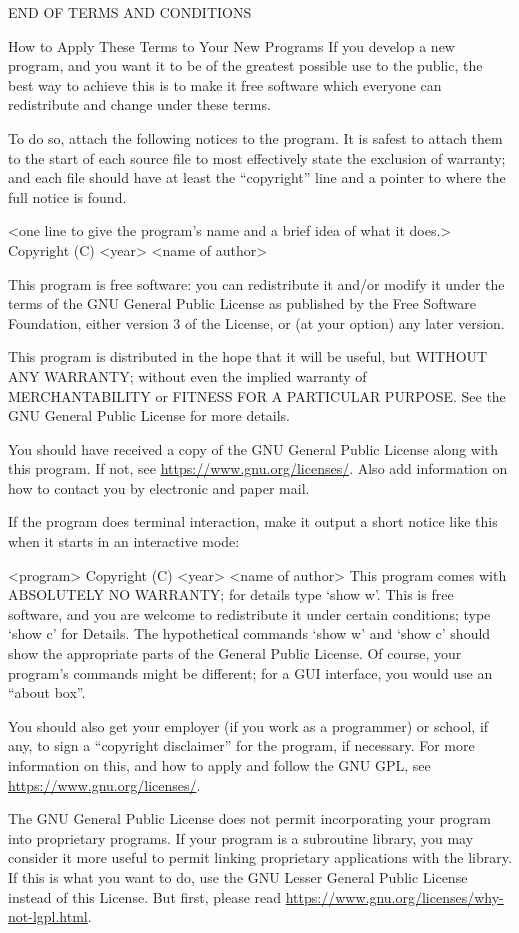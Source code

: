 \documentclass[11pt]{article}
\begin{document}
END OF TERMS AND CONDITIONS

How to Apply These Terms to Your New Programs
If you develop a new program, and you want it to be of the greatest possible use to the public, the best way to achieve this is to make it free software which everyone can redistribute and change under these terms.

To do so, attach the following notices to the program. It is safest to attach them to the start of each source file to most effectively state the exclusion of warranty; and each file should have at least the “copyright” line and a pointer to where the full notice is found.

<one line to give the program's name and a brief idea of what it does.>
Copyright (C) <year>  <name of author>

This program is free software: you can redistribute it and/or modify
it under the terms of the GNU General Public License as published by
the Free Software Foundation, either version 3 of the License, or
(at your option) any later version.

This program is distributed in the hope that it will be useful,
but WITHOUT ANY WARRANTY; without even the implied warranty of
MERCHANTABILITY or FITNESS FOR A PARTICULAR PURPOSE.  See the
GNU General Public License for more details.

    You should have received a copy of the GNU General Public License
    along with this program.  If not, see \url{https://www.gnu.org/licenses/}.
Also add information on how to contact you by electronic and paper mail.

If the program does terminal interaction, make it output a short notice like this when it starts in an interactive mode:

    <program>  Copyright (C) <year>  <name of author>
    This program comes with ABSOLUTELY NO WARRANTY; for details type `show w'.
    This is free software, and you are welcome to redistribute it
    under certain conditions; type `show c' for Details.
The hypothetical commands `show w' and `show c' should show the appropriate parts of the General Public License. Of course, your program's commands might be different; for a GUI interface, you would use an “about box”.

You should also get your employer (if you work as a programmer) or school, if any, to sign a “copyright disclaimer” for the program, if necessary. For more information on this, and how to apply and follow the GNU GPL, see \url{https://www.gnu.org/licenses/}.

The GNU General Public License does not permit incorporating your program into proprietary programs. If your program is a subroutine library, you may consider it more useful to permit linking proprietary applications with the library. If this is what you want to do, use the GNU Lesser General Public License instead of this License. But first, please read \url{https://www.gnu.org/licenses/why-not-lgpl.html}.
\end{document}
